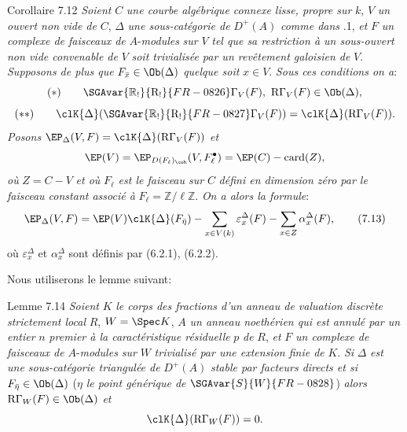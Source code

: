 \begin{statement}{Corollaire 7.12}
\emph{Soient} $C$ \emph{une courbe algébrique connexe lisse, propre sur} $k$, $V$ \emph{un ouvert non vide de} $C$, $\Delta$ \emph{une sous-catégorie de} $D^+(A)$ \emph{comme dans} .1, \emph{et} $F$ \emph{un complexe de faisceaux de} $A$-\emph{modules} \emph{sur} $V$ \emph{tel que sa restriction à un sous-ouvert non vide convenable de} $V$ \emph{soit trivialisée par un revêtement galoisien de} $V$. \emph{Supposons de plus que} $F_{\bar x}\in\Ob(\Delta)$ \emph{quelque soit} $x\in V$. \emph{Sous ces conditions on a}:
\[
(*)\qquad \SGAvar{\mathbb{R}_!}{\mathrm{R}_!}{FR-0826}\Gamma_V(F),\ \mathrm{R}\Gamma_V(F)\in\Ob(\Delta),
\]
\[
(**)\qquad
\clK{\Delta}(\SGAvar{\mathbb{R}_!}{\mathrm{R}_!}{FR-0827}\Gamma_V(F))=\clK{\Delta}(\mathrm{R}\Gamma_V(F)).
\]
\emph{Posons} $\EP_\Delta(V,F)=\clK{\Delta}(\mathrm{R}\Gamma_V(F))$ \emph{et}
\[
\EP(V)=\EP_{D(F_\ell)_{\coh}}(V,F_\ell^\bullet)=\EP(C)-\operatorname{card}(Z),
\]
\emph{où} $Z=C-V$ \emph{et où} $F_\ell$ \emph{est le faisceau sur} $C$ \emph{défini en dimension zéro par le faisceau constant associé à} $F_\ell=\mathbb{Z}/\ell\mathbb{Z}$. \emph{On a alors la formule}:
\[
\EP_\Delta(V,F)
=
\EP(V)\clK{\Delta}(F_{\bar\eta})
-\sum_{x\in V(k)}\varepsilon_x^\Delta(F)
-\sum_{x\in Z}\alpha_x^\Delta(F),
\tag{7.13}
\]
où $\varepsilon_x^\Delta$ et $\alpha_x^\Delta$ sont
définis par (6.2.1), (6.2.2).
\end{statement}

Nous utiliserons le lemme suivant:

\begin{statement}{Lemme 7.14}
\emph{Soient} $K$ \emph{le corps des fractions d'un anneau de valuation discrète strictement local} $R$, $W=\Spec K$, $A$ \emph{un anneau noethérien qui est annulé par un entier} $n$ \emph{premier à la caractéristique résiduelle} $p$ \emph{de} $R$, \emph{et} $F$ \emph{un complexe de faisceaux de} $A$-\emph{modules sur} $W$ \emph{trivialisé par une extension finie de} $K$. \emph{Si} $\Delta$ \emph{est une sous-catégorie triangulée de} $D^+(A)$ \emph{stable par facteurs directs et si} $F_{\bar\eta}\in\Ob(\Delta)$ ($\eta$ \emph{le point générique de} $\SGAvar{S}{W}{FR-0828}$) \emph{alors} $\mathrm{R}\Gamma_W(F)\in\Ob(\Delta)$ \emph{et}
\[
\clK{\Delta}(\mathrm{R}\Gamma_W(F))=0.
\]
\end{statement}

